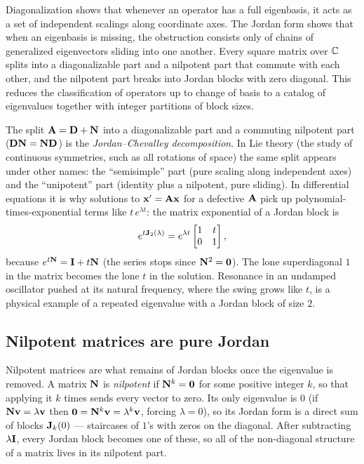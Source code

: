 \begin{aestheticbox}
Diagonalization shows that whenever an operator has a full eigenbasis, it acts as a set of
independent scalings along coordinate axes. The Jordan form shows that when
an eigenbasis is missing, the obstruction consists only of chains
of generalized eigenvectors sliding into one another. Every square matrix over $\mathbb{C}$ splits into
a diagonalizable part and a nilpotent part that commute with each other, and the nilpotent
part breaks into Jordan blocks with zero diagonal. This reduces the classification of operators up to change of basis
to a catalog of eigenvalues together with integer partitions of block sizes.
\end{aestheticbox}

\begin{connectionbox}
The split $\mathbf{A}=\mathbf{D}+\mathbf{N}$ into a diagonalizable part and a commuting nilpotent
part ($\mathbf{D}\mathbf{N}=\mathbf{N}\mathbf{D}$) is the \emph{Jordan--Chevalley decomposition}.
In Lie theory (the study of continuous symmetries, such as all rotations of space)
the same split appears under other names: the ``semisimple'' part (pure scaling along
independent axes) and the ``unipotent'' part (identity plus a nilpotent, pure sliding). In differential equations it is why solutions to
$\mathbf{x}'=\mathbf{A}\mathbf{x}$ for a defective $\mathbf{A}$ pick up polynomial-times-exponential
terms like $t\,e^{\lambda t}$: the matrix exponential of a Jordan block is
\[
e^{t\mathbf{J}_2(\lambda)} = e^{\lambda t}\begin{bmatrix}1&t\\0&1\end{bmatrix},
\]
because $e^{t\mathbf{N}}=\mathbf{I}+t\mathbf{N}$ (the series stops since $\mathbf{N}^2=\mathbf{0}$). The
lone superdiagonal $1$ in the matrix becomes the lone $t$ in the solution. Resonance in an
undamped oscillator pushed at its natural frequency, where the swing grows like $t$, is a
physical example of a repeated eigenvalue with a Jordan block of size $2$.
\end{connectionbox}

\subsection{Nilpotent matrices are pure Jordan}

Nilpotent matrices are what remains of Jordan blocks once the eigenvalue is removed. A
matrix $\mathbf{N}$ is \emph{nilpotent} if $\mathbf{N}^k=\mathbf{0}$ for some positive integer
$k$, so that applying it $k$ times sends every vector to zero. Its only eigenvalue is $0$ (if $\mathbf{N}\mathbf{v}=\lambda\mathbf{v}$ then
$\mathbf{0}=\mathbf{N}^k\mathbf{v}=\lambda^k\mathbf{v}$, forcing $\lambda=0$), so its Jordan form is a
direct sum of blocks $\mathbf{J}_k(0)$ --- staircases of $1$'s with zeros on the diagonal.
After subtracting $\lambda\mathbf{I}$, every Jordan block becomes one of these, so all of
the non-diagonal structure of a matrix lives in its nilpotent part.

